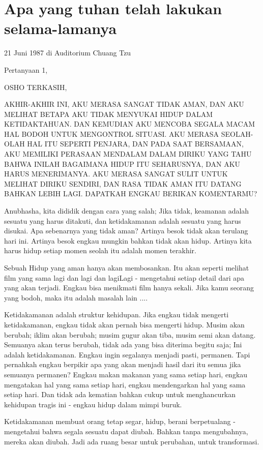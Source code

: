 \chapter{Apa yang tuhan telah lakukan selama-lamanya}

21 Juni 1987 di Auditorium Chuang Tzu

Pertanyaan 1,

OSHO TERKASIH,

AKHIR-AKHIR INI, AKU MERASA SANGAT TIDAK AMAN, DAN AKU MELIHAT BETAPA AKU TIDAK MENYUKAI HIDUP DALAM KETIDAKTAHUAN. DAN KEMUDIAN AKU MENCOBA SEGALA MACAM HAL BODOH UNTUK MENGONTROL SITUASI. AKU MERASA SEOLAH-OLAH HAL ITU SEPERTI PENJARA, DAN PADA SAAT BERSAMAAN, AKU MEMILIKI PERASAAN MENDALAM DALAM DIRIKU YANG TAHU BAHWA INILAH BAGAIMANA HIDUP ITU SEHARUSNYA, DAN AKU HARUS MENERIMANYA. AKU MERASA SANGAT SULIT UNTUK MELIHAT DIRIKU SENDIRI, DAN RASA TIDAK AMAN ITU DATANG BAHKAN LEBIH LAGI. DAPATKAH ENGKAU BERIKAN KOMENTARMU?

Anubhasha, kita dididik dengan cara yang salah; Jika tidak, keamanan adalah sesuatu yang harus ditakuti, dan ketidakamanan adalah sesuatu yang harus disukai. Apa sebenarnya yang tidak aman? Artinya besok tidak akan terulang hari ini. Artinya besok engkau mungkin bahkan tidak akan hidup. Artinya kita harus hidup setiap momen seolah itu adalah momen terakhir.

Sebuah Hidup yang aman hanya akan membosankan. Itu akan seperti melihat film yang sama lagi dan lagi dan lagiLagi - mengetahui setiap detail dari apa yang akan terjadi. Engkau bisa menikmati film hanya sekali. Jika kamu seorang yang bodoh, maka itu adalah masalah lain ....

Ketidakamanan adalah struktur kehidupan. Jika engkau tidak mengerti ketidakamanan, engkau tidak akan pernah bisa mengerti hidup. Musim akan berubah; iklim akan berubah; musim gugur akan tiba, musim semi akan datang. Semuanya akan terus berubah, tidak ada yang bisa diterima begitu saja; Ini adalah ketidakamanan. Engkau ingin segalanya menjadi pasti, permanen. Tapi pernahkah engkau berpikir apa yang akan menjadi hasil dari itu semua jika semuanya permanen? Engkau makan makanan yang sama setiap hari, engkau mengatakan hal yang sama setiap hari, engkau mendengarkan hal yang sama setiap hari. Dan tidak ada kematian bahkan cukup untuk menghancurkan kehidupan tragis ini - engkau hidup dalam mimpi buruk.

Ketidakamanan membuat orang tetap segar, hidup, berani berpetualang - mengetahui bahwa segala sesuatu dapat diubah. Bahkan tanpa mengubahnya, mereka akan diubah. Jadi ada ruang besar untuk perubahan, untuk transformasi.

